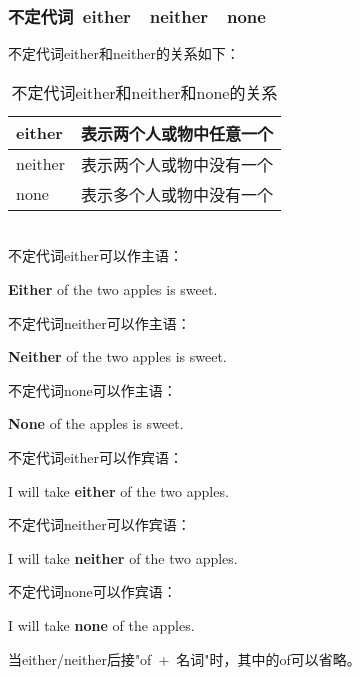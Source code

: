 \documentclass[UTF8]{ctexart}
\newcommand{\littf}[1]{{\hspace{3pt}\ttfamily #1}}
\begin{document}
\newpage

\subsubsection{不定代词~\littf{either}~~\littf{neither}~~\littf{none}}
    不定代词\littf{either}和\littf{neither}的关系如下：
    \begin{table}[h]
        \begin{center}
            \ttfamily
            \begin{tabular}{p{50pt}|p{130pt}}
                \hline
                either&表示两个人或物中任意一个\\ \hline
                neither&表示两个人或物中没有一个\\ \hline
                none&表示多个人或物中没有一个\\ \hline
            \end{tabular}
            \rmfamily
            \caption{不定代词\littf{either}和\littf{neither}和\littf{none}的关系}
        \end{center}
    \end{table}\\
    不定代词\littf{either}可以作主语：
    \begin{center}
        \large\ttfamily
        \textbf{Either} of the two apples is sweet.\\[6mm]
    \end{center}
    不定代词\littf{neither}可以作主语：
    \begin{center}
        \large\ttfamily
        \textbf{Neither} of the two apples is sweet.\\[6mm]
    \end{center}
    不定代词\littf{none}可以作主语：
    \begin{center}
        \large\ttfamily
        \textbf{None} of the apples is sweet.\\[6mm]
    \end{center}
    不定代词\littf{either}可以作宾语：
    \begin{center}
        \large\ttfamily
        I will take \textbf{either} of the two apples.\\[6mm]
    \end{center}
    不定代词\littf{neither}可以作宾语：
    \begin{center}
        \large\ttfamily
        I will take \textbf{neither} of the two apples.\\[6mm]
    \end{center}
    不定代词\littf{none}可以作宾语：
    \begin{center}
        \large\ttfamily
        I will take \textbf{none} of the apples.\\[6mm]
    \end{center}
    当\littf{either/neither}后接\littf{"of~+~名词"}时，其中的\littf{of}可以省略。
\end{document}
